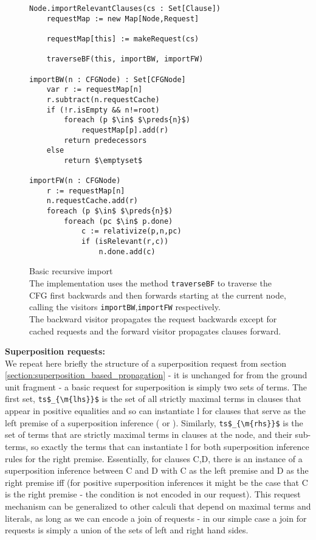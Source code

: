 \begin{figure}
\begin{lstlisting}
Node.importRelevantClauses(cs : Set[Clause])
	requestMap := new Map[Node,Request]
	
	requestMap[this] := makeRequest(cs)
		
	traverseBF(this, importBW, importFW)

importBW(n : CFGNode) : Set[CFGNode]
	var r := requestMap[n]
	r.subtract(n.requestCache)
	if (!r.isEmpty && n!=root)
		foreach (p $\in$ $\preds{n}$)
			requestMap[p].add(r)
		return predecessors
	else
		return $\emptyset$

importFW(n : CFGNode)
	r := requestMap[n]
	n.requestCache.add(r)
	foreach (p $\in$ $\preds{n}$)
		foreach (pc $\in$ p.done)
			c := relativize(p,n,pc)
			if (isRelevant(r,c))
				n.done.add(c)
\end{lstlisting}
\caption{Basic recursive import\\
The implementation uses the method \lstinline|traverseBF| to traverse the CFG first backwards and then forwards starting at the current node, calling the visitors \lstinline|importBW|,\lstinline|importFW| respectively.\\
The backward visitor propagates the request backwards except for cached requests and the forward visitor propagates clauses forward.
}
\label{basic_verification.4.recursiveImport}
\end{figure}

\bigskip

\noindent
\textbf{Superposition requests:}\\
We repeat here briefly the structure of a superposition request from section \ref{section:superposition_based_propagation} - it is unchanged for from the ground unit fragment - a basic request for superposition is simply two sets of terms.
The first set, \lstinline|ts$_{\m{lhs}}$| is the set of all strictly maximal terms in clauses that appear in positive equalities and so can instantiate l for clauses that serve as the left premise of a superposition inference ( or ).
Similarly, \lstinline|ts$_{\m{rhs}}$| is the set of terms that are strictly maximal terms in clauses at the node, and their sub-terms, so exactly the terms that can instantiate l for both superposition inference rules for the right premise.
Essentially, for clauses C,D, there is an instance of a superposition inference between C and D with C as the left premise and D as the right premise iff  (for positive superposition inferences it might be the case that C is the right premise - the condition  is not encoded in our request).
This request mechanism can be generalized to other calculi that depend on maximal terms and literals, as long as we can encode a join of requests - in our simple case a join for requests is simply a union of the sets of left and right hand sides.

